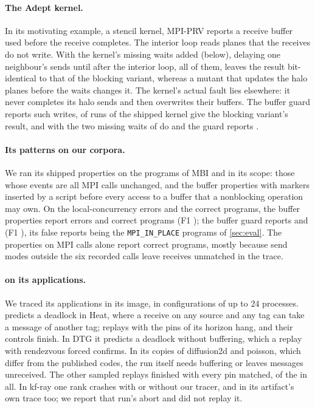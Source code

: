 \paragraph{The Adept kernel.} In its motivating example, a stencil kernel, MPI-PRV reports a
receive buffer used before the receive completes. The interior loop reads planes that the
receives do not write. With the kernel's missing waits added (below), delaying one neighbour's
sends until after the interior loop, all \nPRVadeptDelayOneLate of them, leaves the result
bit-identical to that of the blocking variant, whereas a mutant that updates the halo planes
before the waits changes it. The kernel's actual fault lies elsewhere: it never completes its
halo sends and then overwrites their buffers. The buffer guard reports \nPRVadeptGuard such
writes, \nPRVadeptOrigSame of \nPRVadeptOrigRuns runs of the shipped kernel give the blocking
variant's result, and with the two missing waits \nPRVadeptFixedSame of \nPRVadeptFixedRuns do
and the guard reports \nPRVadeptGuardFixed.

\paragraph{Its patterns on our corpora.} We ran its shipped properties on the \nPRVinScope
programs of MBI and \MBB in its scope: those whose events are all MPI calls unchanged, and the
buffer properties with markers inserted by a script before every access to a buffer that a
nonblocking operation may own. On the local-concurrency errors and the correct programs, the
buffer properties report \nPRVtpBLC errors and \nPRVfpBLC correct programs (F1 \PRVfoneBLC); the
buffer guard reports \nPRVtpStrettoLC and \nPRVfpStrettoLC (F1 \PRVfoneStrettoLC), its false
reports being the \texttt{MPI\_IN\_PLACE} programs of \cref{sec:eval}. The properties on MPI calls
alone report \nPRVfpA correct programs, mostly because send modes outside the six recorded calls
leave receives unmatched in the trace.

\paragraph{\tool on its applications.} We traced its \nPRVapps applications in its image, in
\nPRVappConfigs configurations of up to 24 processes. \tool predicts a deadlock in Heat, where a
receive on any source and any tag can take a message of another tag; replays with the pins of
its horizon hang, and their controls finish. In DTG it predicts a deadlock without buffering,
which a replay with rendezvous forced confirms. In its copies of diffusion2d and poisson, which
differ from the published codes, the run itself needs buffering or leaves messages unreceived.
The other sampled replays finished with every pin matched, \nPRVappsReplayFinished of the
\nPRVappsReplays in all. In kf-ray one rank crashes with or without our tracer, and in its
artifact's own trace too; we report that run's abort and did not replay it.
